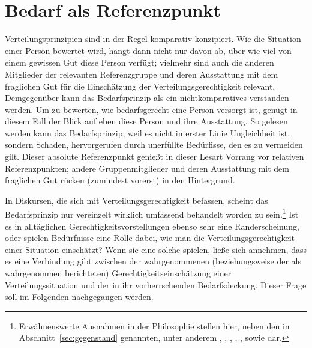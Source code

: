 \documentclass[justified,nobib,symmetric,twoside]{tufte-handout}
\begin{document}
\section{Bedarf als Referenzpunkt}\label{sec:referenzpunkt}
Verteilungsprinzipien sind in der Regel komparativ konzipiert.
Wie die Situation einer Person bewertet wird, hängt dann nicht nur davon ab, über wie viel von einem gewissen Gut diese Person verfügt; vielmehr sind auch die anderen Mitglieder der relevanten Referenzgruppe und deren Ausstattung mit dem fraglichen Gut für die Einschätzung der Verteilungsgerechtigkeit relevant.
Demgegenüber kann das Bedarfsprinzip als ein nichtkomparatives verstanden werden.
Um zu bewerten, wie bedarfsgerecht eine Person versorgt ist, genügt in diesem Fall der Blick auf eben diese Person und ihre Ausstattung.
So gelesen werden kann das Bedarfsprinzip, weil es nicht in erster Linie Ungleichheit ist, sondern Schaden, hervorgerufen durch unerfüllte Bedürfisse, den es zu vermeiden gilt.
Dieser absolute Referenzpunkt genießt in dieser Lesart Vorrang vor relativen Referenzpunkten; andere Gruppenmitglieder und deren Ausstattung mit dem fraglichen Gut rücken (zumindest vorerst) in den Hintergrund.

In Diskursen, die sich mit Verteilungsgerechtigkeit befassen, scheint das Bedarfsprinzip nur vereinzelt wirklich umfassend behandelt worden zu sein.\footnote{Erwähnenswerte Ausnahmen in der Philosophie stellen hier, neben den in Abschnitt~\ref{sec:gegenstand} genannten, unter anderem \citet{braybrooke_meeting_1987}, \citet{brock_necessary_1998}, \citet{doyal_theory_1991}, \citet{hamilton_political_2003}, \citet{reader_philosophy_2005}, \citet{thomson_needs_1987} sowie \citet{wiggins_needs_1998} dar.}
Ist es in alltäglichen Gerechtigkeitsvorstellungen ebenso sehr eine Randerscheinung, oder spielen Bedürfnisse eine Rolle dabei, wie man die Verteilungsgerechtigkeit einer Situation einschätzt?
Wenn sie eine solche spielen, ließe sich annehmen, dass es eine Verbindung gibt zwischen der wahrgenommenen (beziehungsweise der als wahrgenommen berichteten) Gerechtigkeitseinschätzung einer Verteilungssituation und der in ihr vorherrschenden Bedarfsdeckung.
Dieser Frage soll im Folgenden nachgegangen werden.
\end{document}
